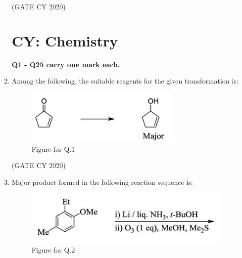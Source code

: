 \documentclass[12pt]{article}
\begin{document}
\begin{enumerate}
\begin{enumerate}
\end{enumerate}
\hfill (GATE CY 2020)


\section*{CY: Chemistry}
\textbf{Q1 - Q25 carry one mark each.}

\setcounter{enumi}{0}

\item Among the following, the suitable reagents for the given transformation is:

\begin{figure}[H]
    \centering
    \includegraphics[width=0.4\columnwidth]{figs/q1.png}
    \caption{Figure for Q.1}
    \label{fig:q1}
\end{figure}

\begin{enumerate}
\end{enumerate}
\hfill (GATE CY 2020)

\item Major product formed in the following reaction sequence is:

\begin{figure}[H]
    \centering
    \includegraphics[width=0.4\columnwidth]{figs/q2.png}
    \caption{Figure for Q.2}
    \label{fig:q2}
\end{figure}



\end{enumerate}
\end{document}
